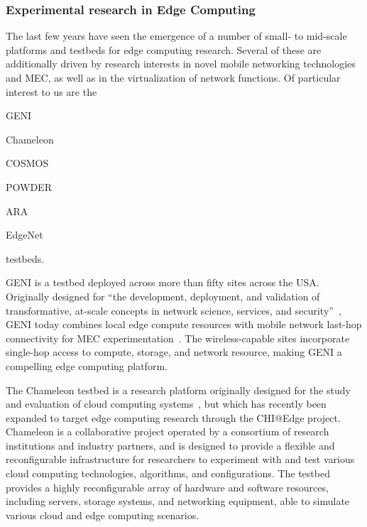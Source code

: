 \subsubsection{Experimental research in Edge Computing}

The last few years have seen the emergence of a number of small- to mid-scale platforms and testbeds for edge computing research.
Several of these are additionally driven by research interests in novel mobile networking technologies and \gls{MEC}, as well as in the virtualization of network functions.
Of particular interest to us are the
\begin{inlineenum}
    \item \acs{GENI}
    \item Chameleon
    \item \acs{COSMOS}
    \item \acs{POWDER}
    \item \acs{ARA}
    \item EdgeNet
\end{inlineenum} testbeds.

\gls{GENI} is a testbed deployed across more than fifty sites across the \gls{USA}.
Originally designed for ``the development, deployment, and validation of transformative, at-scale concepts in network science, services, and security''~\cite{berman2014geni}, \gls{GENI} today combines local edge compute resources with mobile network last-hop connectivity for \gls{MEC} experimentation~\cite{gosain2017geni}.
The wireless-capable sites incorporate single-hop access to compute, storage, and network resource, making \gls{GENI} a compelling edge computing platform.

The Chameleon testbed is a research platform originally designed for the study and evaluation of cloud computing systems~\cite{keahey2020lessons}, but which has recently been expanded to target edge computing research through the \acs{CHI}@Edge project.
Chameleon is a collaborative project operated by a consortium of research institutions and industry partners, and is designed to provide a flexible and reconfigurable infrastructure for researchers to experiment with and test various cloud computing technologies, algorithms, and configurations.
The testbed provides a highly reconfigurable array of hardware and software resources, including servers, storage systems, and networking equipment, able to simulate various cloud and edge computing scenarios.

